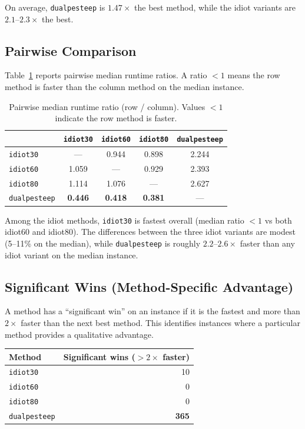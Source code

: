 \documentclass[11pt,a4paper]{article}
\newcommand{\best}[1]{\cellcolor{bestcell}\textbf{#1}}
\begin{document}
\noindent On average, \texttt{dualpesteep} is $1.47\times$ the best method, while
the idiot variants are $2.1$--$2.3\times$ the best.

\subsection{Pairwise Comparison}

Table~\ref{tab:pairwise} reports pairwise median runtime ratios. A ratio $< 1$
means the row method is faster than the column method on the median instance.

\begin{table}[h]
\centering
\caption{Pairwise median runtime ratio (row / column). Values $<1$ indicate
the row method is faster.}
\label{tab:pairwise}
\begin{tabular}{lcccc}
\toprule
 & \texttt{idiot30} & \texttt{idiot60} & \texttt{idiot80} & \texttt{dualpesteep} \\
\midrule
\texttt{idiot30}     & --- & 0.944 & 0.898 & 2.244 \\
\texttt{idiot60}     & 1.059 & --- & 0.929 & 2.393 \\
\texttt{idiot80}     & 1.114 & 1.076 & --- & 2.627 \\
\texttt{dualpesteep} & \best{0.446} & \best{0.418} & \best{0.381} & --- \\
\bottomrule
\end{tabular}
\end{table}

\noindent Among the idiot methods, \texttt{idiot30} is fastest overall (median
ratio $< 1$ vs both idiot60 and idiot80). The differences between the three idiot
variants are modest (5--11\% on the median), while \texttt{dualpesteep} is
roughly $2.2$--$2.6\times$ faster than any idiot variant on the median instance.

\subsection{Significant Wins (Method-Specific Advantage)}

A method has a ``significant win'' on an instance if it is the fastest and more
than $2\times$ faster than the next best method. This identifies instances where a
particular method provides a qualitative advantage.

\begin{center}
\begin{tabular}{lr}
\toprule
\textbf{Method} & \textbf{Significant wins ($>2\times$ faster)} \\
\midrule
\texttt{idiot30}     & 10 \\
\texttt{idiot60}     & 0 \\
\texttt{idiot80}     & 0 \\
\texttt{dualpesteep} & \best{365} \\
\bottomrule
\end{tabular}
\end{center}
\end{document}
